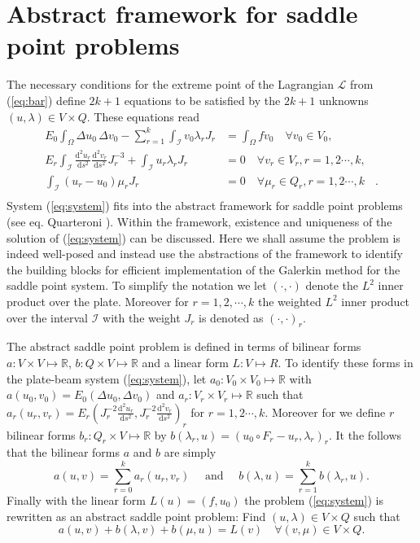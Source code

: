 \documentclass{marine_2015}
\newcommand{\inner}[2]{\ensuremath{\left(#1, #2\right)}}
\newcommand{\rinner}[2]{\ensuremath{\left(#1, #2\right)_r}}
\newcommand{\ainner}[2]{\ensuremath{a\left(#1, #2\right)}}
\newcommand{\arinner}[2]{\ensuremath{a_r\left(#1, #2\right)}}
\newcommand{\binner}[2]{\ensuremath{b\left(#1, #2\right)}}
\newcommand{\brinner}[2]{\ensuremath{b\left(#1, #2\right)}}
\newcommand{\Linner}[1]{\ensuremath{L\left(#1\right)}}
\newcommand{\deriv}[2]{\ensuremath{\frac{\mathrm{d}#1}{\mathrm{d}#2}}}
\newcommand{\tderiv}[2]{\ensuremath{\tfrac{\mathrm{d}#1}{\mathrm{d}#2}}}
\begin{document}
\section{Abstract framework for saddle point problems}
\label{sec:abstract}
The necessary conditions for the extreme point of the Lagrangian $\mathcal{L}$
from (\ref{eq:bar}) define $2k+1$ equations to be satisfied by the $2k+1$
unknowns $\left(u, \lambda\right)\in V\times Q$. These equations read
\[
  \begin{aligned}
    \label{eq:system}
    E_0\displaystyle\int_{\Omega}\Delta u_0\,\Delta v_0-
    \sum_{r=1}^k\int_{\mathcal{I}}v_0\lambda_r J_r &=\displaystyle\int_{\Omega}f
    v_0\quad\forall v_0\in V_0,& \\
    E_r\displaystyle\int_{\mathcal{I}}
    \deriv{^2u_r}{s^2}\deriv{^2v_r}{s^2}J_r^{-3} +
  \int_{\mathcal{I}} u_r \lambda_r J_r &= 0\quad\forall v_r\in V_r, r=1,
    2\cdots, k,&\\
  \int_{\mathcal{I}}\left(u_r-u_0\right)\mu_r J_r &= 0\quad\forall \mu_r\in Q_r,
    r=1, 2\cdots, k&.\\
  \end{aligned}
\]
System (\ref{eq:system}) fits into the abstract framework for saddle point
problems (see eq. Quarteroni \cite{quarteroni}). Within the framework, existence
and uniqueness of the solution of (\ref{eq:system}) can be discussed. Here we
shall assume the problem is indeed well-posed and instead use the abstractions
of the framework to identify the building blocks for efficient implementation
of the Galerkin method for the saddle point system. To simplify the notation we
let $\inner{\cdot}{\cdot}$ denote the $L^2$ inner product over the plate.
Moreover for $r=1, 2, \cdots, k$ the weighted $L^2$ inner product over the
interval $\mathcal{I}$ with the weight $J_r$ is denoted as $\rinner{\cdot}{\cdot}$.

The abstract saddle point problem is defined in terms of bilinear forms $a:V\times V\mapsto \mathbb{R}$,
$b:Q\times V\mapsto \mathbb{R}$ and a linear form $L:V\mapsto R$. To identify these 
forms in the plate-beam system (\ref{eq:system}), let $a_0:V_0\times V_0\mapsto
\mathbb{R}$ with $\ainner{u_0}{v_0}=E_0\inner{\Delta u_0}{\Delta v_0}$ and
$a_r:V_r\times V_r\mapsto \mathbb{R}$ such that $\arinner{u_r}{v_r}=E_r\rinner{J_r^{-2}\tderiv{^2 u_r}{s^2}}{J_r^{-2}\tderiv{^2
v_r}{s^2}}$ for $r=1, 2\cdots, k$. Moreover for we define $r$ bilinear forms
$b_r:Q_r\times V\mapsto\mathbb{R}$ by
$\brinner{\lambda_r}{u}=\rinner{u_0\circ F_r-u_r}{\lambda_r}$. It the follows 
that the bilinear forms $a$ and $b$ are simply
\[
  \ainner{u}{v} = \displaystyle\sum_{r=0}^{k}\arinner{u_r}{v_r}\quad\text{ and
  }\quad\binner{\lambda}{u} = \displaystyle\sum_{r=1}^{k}\brinner{\lambda_r}{u}.
\]
Finally with the linear form $\Linner{u}=\inner{f}{u_0}$ the problem
(\ref{eq:system}) is rewritten as an abstract saddle point problem: Find
$\left(u, \lambda\right)\in V\times Q$ such that
\begin{equation}
  \label{eq:abstract_saddle}
  \ainner{u}{v} + \binner{\lambda}{v} + \binner{\mu}{u} = \Linner{v}\quad\forall
  \left(v, \mu\right)\in V\times Q.
\end{equation}
\end{document}
